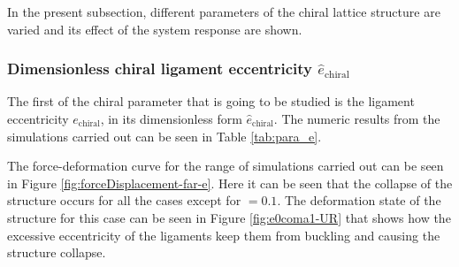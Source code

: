     In the present subsection, different parameters of the chiral lattice structure are varied and its effect of the system response are shown. 

    \subsubsection{Dimensionless chiral ligament eccentricity $\hat{e}_{\mathrm{chiral}}$}

      The first of the chiral parameter that is going to be studied is the ligament eccentricity $e_{\mathrm{chiral}}$, in its dimensionless form $\hat{e}_{\mathrm{chiral}}$. The numeric results from the simulations carried out can be seen in Table \ref{tab:para_e}.

      The force-deformation curve for the range of simulations carried out can be seen in Figure \ref{fig:forceDisplacement-far-e}. Here it can be seen that the collapse of the structure occurs for all the cases except for \chie$= 0.1$. The deformation state of the structure for this case can be seen in Figure \ref{fig:e0coma1-UR} that shows how the excessive eccentricity of the ligaments keep them from buckling and causing the structure collapse.


